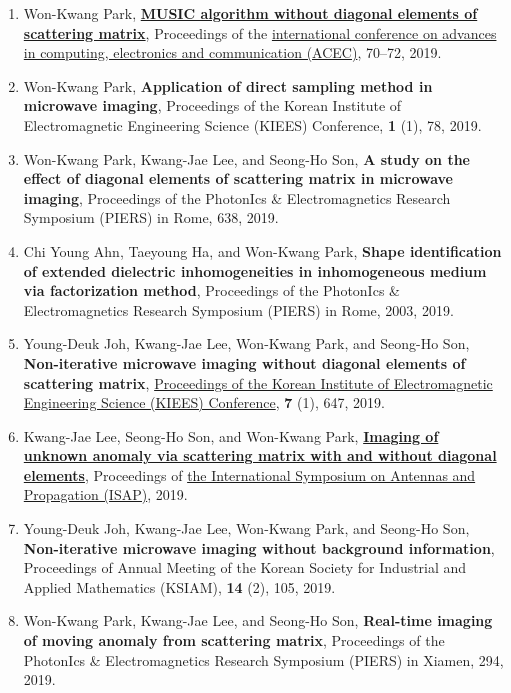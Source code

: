 \documentclass[10pt,A4]{article}
\begin{document}
\begin{enumerate}
\item\label{C-ACEC2019} Won-Kwang Park, \href{https://doi.org/10.15224/978-1-63248-165-8-14}{\textbf{MUSIC algorithm without diagonal elements of scattering matrix}}, Proceedings of the \href{https://acec.theired.org/}{ international conference on advances in computing, electronics and communication (ACEC)}, 70--72, 2019.
\item\label{C-KIEES2019A} Won-Kwang Park, \textbf{Application of direct sampling method in microwave imaging}, Proceedings of the Korean Institute of Electromagnetic Engineering Science (KIEES) Conference, \textbf{1} (1), 78, 2019.
\item\label{C-PIERS2019A} Won-Kwang Park, Kwang-Jae Lee, and Seong-Ho Son, \textbf{A study on the effect of diagonal elements of scattering matrix in microwave imaging}, Proceedings of the PhotonIcs \& Electromagnetics Research Symposium (PIERS) in Rome, 638, 2019.
\item\label{C-PIERS2019B} Chi Young Ahn, Taeyoung Ha, and Won-Kwang Park, \textbf{Shape identification of extended dielectric inhomogeneities in inhomogeneous medium via factorization method}, Proceedings of the PhotonIcs \& Electromagnetics Research Symposium (PIERS) in Rome, 2003, 2019.
\item\label{C-KIEES2019B} Young-Deuk Joh, Kwang-Jae Lee, Won-Kwang Park, and Seong-Ho Son, \textbf{Non-iterative microwave imaging without diagonal elements of scattering matrix}, \href{http://kiees_sch.jslab.org/download/(KIEES)_2019_Summer_Conference_paper.zip}{Proceedings of the Korean Institute of Electromagnetic Engineering Science (KIEES) Conference}, \textbf{7} (1), 647, 2019.
\item\label{C-ISAP2019} Kwang-Jae Lee, Seong-Ho Son, and Won-Kwang Park, \href{https://ieeexplore.ieee.org/document/8963454}{\textbf{Imaging of unknown anomaly via scattering matrix with and without diagonal elements}}, Proceedings of \href{http://www.em-conf.com/isap2019/index.php}{the International Symposium on Antennas and Propagation (ISAP)}, 2019.
\item\label{C-KSIAM2019} Young-Deuk Joh, Kwang-Jae Lee, Won-Kwang Park, and Seong-Ho Son, \textbf{Non-iterative microwave imaging without background information}, Proceedings of Annual Meeting of the Korean Society for Industrial and Applied Mathematics (KSIAM), \textbf{14} (2), 105, 2019.
\item\label{C-PIERS2019C} Won-Kwang Park, Kwang-Jae Lee, and Seong-Ho Son, \textbf{Real-time imaging of moving anomaly from scattering matrix}, Proceedings of the PhotonIcs \& Electromagnetics Research Symposium (PIERS) in Xiamen, 294, 2019.

\end{enumerate}
\end{document}
